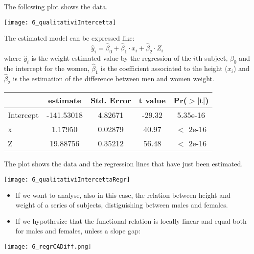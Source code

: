 \begin{frame}
  The following plot shows the data.
  \begin{center}
    \texttt{[image: 6\_qualitativiIntercetta]}
  \end{center}
\end{frame}

\begin{frame}
  The estimated model can be expressed like: $$ \hat{y}_i = \hat{\beta}_0 + \hat{\beta}_1 \cdot x_{i} + \hat{\beta}_2 \cdot Z_{i} $$ where $ \hat{y}_i $ is the weight estimated value by the regression of the $i$th subject, $ \hat{\beta}_0 $ and the intercept for the women, $ \hat{\beta}_1 $ is the coefficient associated to the height ($ x_{i} $) and $ \hat{\beta}_2 $ is the estimation of the difference between men and women weight.\\
  \vspace{1cm}
  \begin{center}
    \begin{tabular}{|l|c|c|c|c|}
      \hline
                 &       estimate & Std. Error & t value & Pr($>|$t$|$)\\ 
      \hline
      Intercept & -141.53018 &    4.82671 &  -29.32 &   5.35e-16  \\
      \hline
      x          &    1.17950 &    0.02879 &   40.97 &   $<$ 2e-16   \\
      \hline
      Z          &   19.88756 &    0.35212 &   56.48 &   $<$ 2e-16   \\
      \hline
    \end{tabular}
  \end{center}
\end{frame}

\begin{frame}[fragile]
  The plot shows the data and the regression lines that have just been estimated.
  \begin{center}
    \texttt{[image: 6\_qualitativiIntercettaRegr]}
  \end{center}
\end{frame}


\begin{frame}
  \begin{itemize}
    \item If we want to analyse, also in this case, the relation between height and weight of a series of subjects, distiguishing between males and females.
    \item If we hypothesize that the functional relation is locally linear and equal both for males and females, unless a slope gap:
  \end{itemize}
  \begin{center}
    \texttt{[image: 6\_regrCADiff.png]}
  \end{center}
\end{frame}


